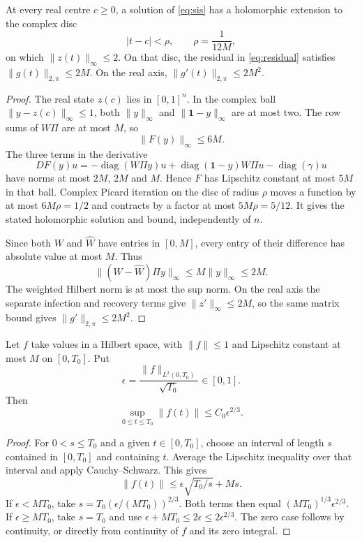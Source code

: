 \begin{lemma}
\label{lem:analytic-disc}
At every real centre $c\geq0$, a solution of \eqref{eq:sis} has a holomorphic extension to the complex disc
\[
 |t-c|<\rho,\qquad \rho=\frac1{12M},
\]
on which $\|z(t)\|_\infty\leq2$. On that disc, the residual in \eqref{eq:residual} satisfies $\|g(t)\|_{2,\pi}\leq2M$. On the real axis, $\|g'(t)\|_{2,\pi}\leq2M^2$.
\end{lemma}

\begin{proof}
The real state $z(c)$ lies in $[0,1]^n$. In the complex ball $\|y-z(c)\|_\infty\leq1$, both $\|y\|_\infty$ and $\|\mathbf1-y\|_\infty$ are at most two. The row sums of $W\Pi$ are at most $M$, so
\[
 \|F(y)\|_\infty\leq6M.
\]
The three terms in the derivative
\[
 DF(y)u=-\operatorname{diag}(W\Pi y)u
  +\operatorname{diag}(\mathbf1-y)W\Pi u
  -\operatorname{diag}(\gamma)u
\]
have norms at most $2M$, $2M$ and $M$. Hence $F$ has Lipschitz constant at most $5M$ in that ball. Complex Picard iteration on the disc of radius $\rho$ moves a function by at most $6M\rho=1/2$ and contracts by a factor at most $5M\rho=5/12$. It gives the stated holomorphic solution and bound, independently of $n$.

Since both $W$ and $\widehat W$ have entries in $[0,M]$, every entry of their difference has absolute value at most $M$. Thus
\[
 \|(W-\widehat W)\Pi y\|_\infty\leq M\|y\|_\infty\leq2M.
\]
The weighted Hilbert norm is at most the sup norm. On the real axis the separate infection and recovery terms give $\|z'\|_\infty\leq2M$, so the same matrix bound gives $\|g'\|_{2,\pi}\leq2M^2$.
\end{proof}

\begin{lemma}
\label{lem:l2-sup}
Let $f$ take values in a Hilbert space, with $\|f\|\leq1$ and Lipschitz constant at most $M$ on $[0,T_0]$. Put
\[
 \epsilon=\frac{\|f\|_{L^2(0,T_0)}}{\sqrt{T_0}}\in[0,1].
\]
Then
\[
 \sup_{0\leq t\leq T_0}\|f(t)\|\leq C_0\epsilon^{2/3}.
\]
\end{lemma}

\begin{proof}
For $0<s\leq T_0$ and a given $t\in[0,T_0]$, choose an interval of length $s$ contained in $[0,T_0]$ and containing $t$. Average the Lipschitz inequality over that interval and apply Cauchy--Schwarz. This gives
\[
 \|f(t)\|\leq\epsilon\sqrt{T_0/s}+Ms.
\]
If $\epsilon<MT_0$, take $s=T_0(\epsilon/(MT_0))^{2/3}$. Both terms then equal $(MT_0)^{1/3}\epsilon^{2/3}$. If $\epsilon\geq MT_0$, take $s=T_0$ and use $\epsilon+MT_0\leq2\epsilon\leq2\epsilon^{2/3}$. The zero case follows by continuity, or directly from continuity of $f$ and its zero integral.
\end{proof}

